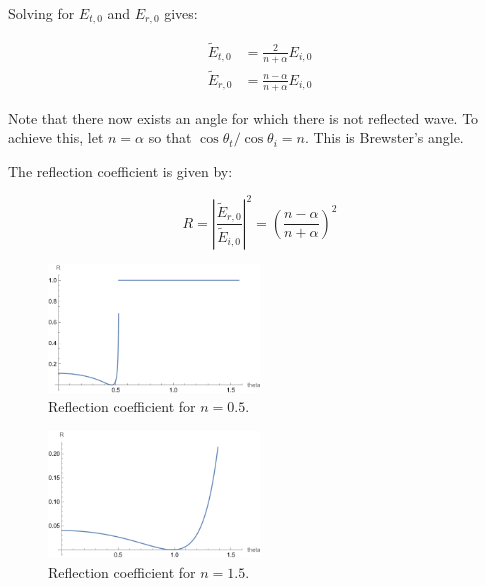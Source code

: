 \documentclass[12pt]{article}
\begin{document}
Solving for $E_{t, 0}$ and $E_{r, 0}$ gives:

\begin{equation}
\begin{split}
    \tilde{E}_{t, 0} &= \frac{2}{n + \alpha} E_{i, 0} \\
    \tilde{E}_{r, 0} &= \frac{n - \alpha}{n + \alpha} E_{i, 0}
\end{split}
\end{equation}

Note that there now exists an angle for which there is not reflected wave. To achieve this, let $n = \alpha$ so that $\cos{\theta_{t}}/\cos{\theta_{i}} = n$. This is Brewster's angle.

The reflection coefficient is given by:

\begin{equation}
    R = \left\lvert \frac{\tilde{E}_{r, 0}}{\tilde{E}_{i, 0}} \right\rvert^{2} = \left( \frac{n - \alpha}{n + \alpha} \right)^{2}
\end{equation}

\begin{figure}[htt]
    \centering
    \includegraphics[width=0.5\textwidth]{../plots/electro_3_3_c.png}
    \caption{Reflection coefficient for $n = 0.5$.}
    \label{fig:reflection_coefficient_3}
\end{figure}

\begin{figure}[htt]
    \centering
    \includegraphics[width=0.5\textwidth]{../plots/electro_3_3_d.png}
    \caption{Reflection coefficient for $n = 1.5$.}
    \label{fig:reflection_coefficient_4}
\end{figure}
\end{document}
